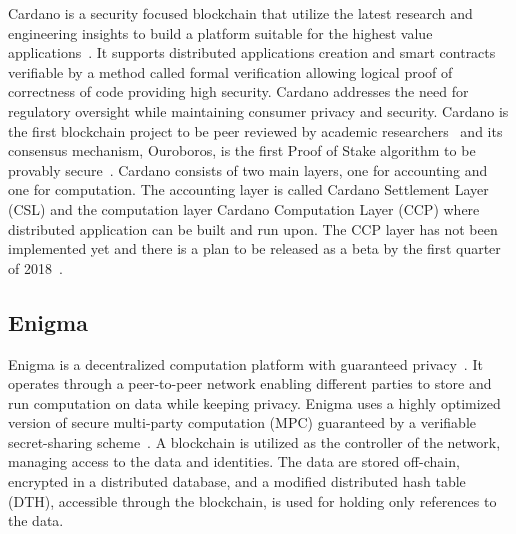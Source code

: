 Cardano is a security focused blockchain that utilize the latest research and engineering insights to build a platform suitable for
the highest value applications~\cite{cardano_site}. It supports distributed applications creation and smart contracts verifiable by a method called formal
verification allowing logical proof of correctness of code providing high security. Cardano addresses the need for regulatory oversight while
maintaining consumer privacy and security. Cardano is the first blockchain project to be peer reviewed by academic researchers~\cite{cardano_site} and its consensus
mechanism, Ouroboros, is the first Proof of Stake algorithm to be provably secure~\cite{Kiayias2017}.
Cardano consists of two main layers, one for accounting and one for computation. The accounting layer is called Cardano Settlement Layer (CSL)
and the computation layer Cardano Computation Layer (CCP) where distributed application can be built and run upon. The CCP layer has not been
implemented yet and there is a plan to be released as a beta by the first quarter of 2018~\cite{cardano_parsons}.

\subsection{Enigma}\label{blockchain:impl:enigma}

Enigma is a decentralized computation platform with guaranteed privacy~\cite{DBLP:journals/corr/ZyskindNP15}. It operates through a peer-to-peer network enabling
different parties to store and run computation on data while keeping privacy. Enigma uses a highly optimized version of secure multi-party computation (MPC)
guaranteed by a verifiable secret-sharing scheme~\cite{DBLP:journals/corr/ZyskindNP15}. A blockchain is utilized as the controller of the network, managing access to the data and identities.
The data are stored off-chain, encrypted in a distributed database, and a modified distributed hash table (DTH), accessible through the blockchain, is used for holding only references to the data.
